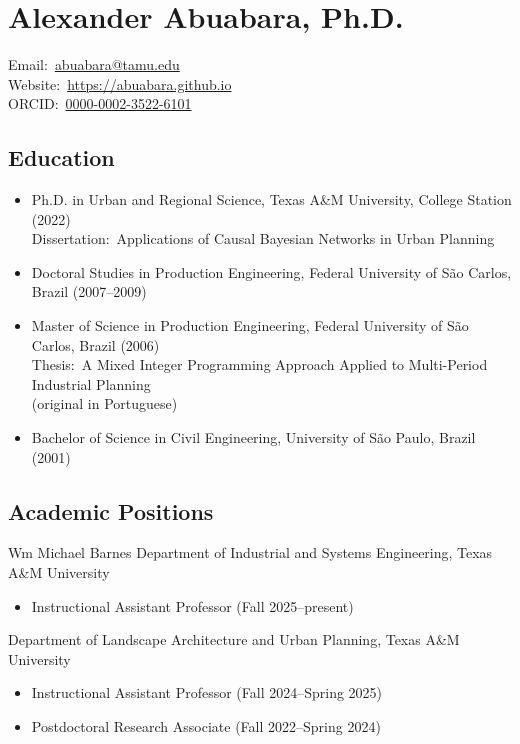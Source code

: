 \documentclass[11pt]{article}
\begin{document}
\raggedright

\section*{Alexander Abuabara, Ph.D.}
Email:~\href{mailto:abuabara@tamu.edu}{abuabara@tamu.edu}\\[1pt]
Website:~\url{https://abuabara.github.io}\\[1pt]
ORCID:~\href{https://orcid.org/0000-0002-3522-6101}{0000-0002-3522-6101}

\subsection*{Education}
\vspace{-5pt}
\begin{itemize}[leftmargin=20pt]
\item Ph.D. in Urban and Regional Science, Texas A\&M University, College Station (2022)\\
      Dissertation:~Applications of Causal Bayesian Networks in Urban Planning
\item Doctoral Studies in Production Engineering, Federal University of São Carlos, Brazil (2007--2009)
\item Master of Science in Production Engineering, Federal University of São Carlos, Brazil (2006)\\
      Thesis:~A Mixed Integer Programming Approach Applied to Multi-Period Industrial Planning\\
      {\small (original in Portuguese)}
\item Bachelor of Science in Civil Engineering, University of São Paulo, Brazil (2001)
\end{itemize}

\subsection*{Academic Positions}
\vspace{-5pt}
Wm Michael Barnes Department of Industrial and Systems Engineering, Texas A\&M University
\begin{itemize}[leftmargin=20pt]
\item Instructional Assistant Professor (Fall 2025--present)
\end{itemize}

\vspace{3pt}

Department of Landscape Architecture and Urban Planning, Texas A\&M University
\begin{itemize}[leftmargin=20pt]
\item Instructional Assistant Professor (Fall 2024--Spring 2025)
\item Postdoctoral Research Associate (Fall 2022--Spring 2024)
\end{itemize}
\end{document}
